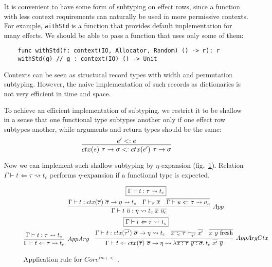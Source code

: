 \documentclass[acmsmall]{acmart}
\newcommand{\mathframebox}[1]{\framebox{$\displaystyle #1$}}
\newcommand{\ap}{~}
\newcommand{\ctx}[1]{ctx(#1)~}
\newcommand{\step}{\rightsquigarrow}
\begin{document}
It is convenient to have some form of subtyping on effect rows, since a function with less context requirements can naturally be used in more permissive contexts.
For example, \texttt{withStd} is a function that provides default implementation for many effects.
We should be able to pass a function that uses only some of them:
\begin{verbatim}
    func withStd(f: context(IO, Allocator, Random) () -> r): r
    withStd(g) // g : context(IO) () -> Unit
\end{verbatim}

Contexts can be seen as structural record types with width and permutation subtyping.
However, the naive implementation of such records as dictionaries is not very efficient in time and space.

To achieve an efficient implementation of subtyping, we restrict it to be shallow in a sense that one functional type subtypes another only if one effect row subtypes another, while arguments and return types should be the same:
\[
    \infer{\ctx{e} \tau \to \sigma <: \ctx{e'} \tau\to\sigma}{e' <: e}
\]

Now we can implement such shallow subtyping by $\eta$-expansion (fig.\ \ref{sig:fim-sub-app}).
Relation $\Gamma\vdash t\Leftarrow \tau \step t_c$ performs $\eta$-expansion if a functional type is expected.

\begin{figure}
    \begin{gather*}
        \mathframebox{\Gamma\vdash t : \tau \step t_c} \\
        \infer[App]{
            \Gamma\vdash t\ap\overline{u} : \eta \step t_c \ap \overline{x} \ap \overline{u_c}
        }{
            \Gamma\vdash t : ctx(\overline{\tau})~\overline{\sigma}\to \eta \step t_c
            &
            \Gamma \vdash_{\overline{\tau}} \overline{x}
            &
            \overline{\Gamma\vdash u \Leftarrow \sigma \step u_c}
        } \\
        \mathframebox{\Gamma\vdash t \Leftarrow \tau \step t_c} \\
        \infer[AppArg]{
            \Gamma\vdash t \Leftarrow \tau \step t_c
        }{
            \Gamma\vdash t : \tau \step t_c
        }
        \text{\hspace{1em}}
        \infer[AppArgCtx]{
            \Gamma \vdash t \Leftarrow ctx(\overline{\tau}) ~\overline{\sigma}\to\eta\step \lambda \overline{x : \tau}~\overline{y : \sigma}\ldotp t_c\ap \overline{x'}\ap\overline{y}
        }{
            \Gamma \vdash t : ctx(\overline{\tau'}) ~\overline{\sigma}\to\eta \step t_c
            &
            \overline{x :_c \tau} \vdash_{\overline{\tau'}} \overline{x'}
            &
            \overline{x~y \text{ fresh}}
        }
    \end{gather*}
    \caption{Application rule for $Core^{im + <:}$.}
    \label{sig:fim-sub-app}
\end{figure}
\end{document}
